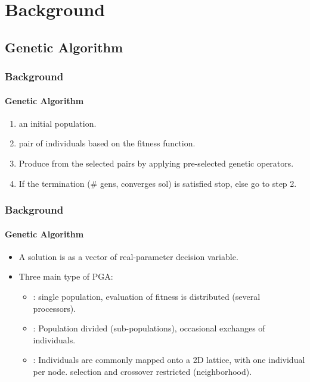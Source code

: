\section{Background}
\subsection{Genetic Algorithm}
\frame
{
\frametitle{Background}
\framesubtitle{Genetic Algorithm}
\begin{enumerate}
	\item {} an initial population.
	\item {} pair of individuals based on the fitness function.
	\item Produce  from the selected pairs by applying pre-selected genetic operators.
	\item If the termination  (\# gens, converges sol) is satisfied stop, else go to step 2.
\end{enumerate}
}

\frame
{
\frametitle{Background}
\framesubtitle{Genetic Algorithm}
\begin{itemize}
	\item A solution is  as a vector of real-parameter decision variable.
	\item Three main type of PGA:
	\begin{itemize}
		\item {}:
			single population, evaluation of fitness is distributed (several processors).
		\item {}:
			Population divided (sub-populations), occasional exchanges of individuals.
		\item {}:
			Individuals are commonly mapped onto a 2D lattice, with one individual per node.
			selection and crossover restricted (neighborhood).
	\end{itemize}
\end{itemize}
}
